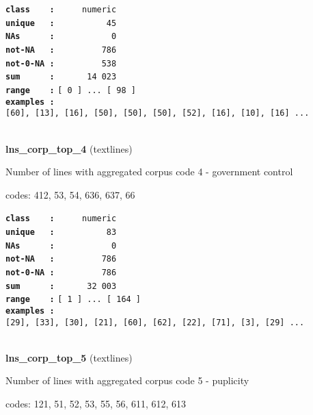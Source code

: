 \documentclass[]{article}
\begin{document}
\textbf{\texttt{class\ \ \ \ :}} \texttt{~~~~~numeric}\\
\textbf{\texttt{unique\ \ \ :}} \texttt{~~~~~~~~~~45}\\
\textbf{\texttt{NAs\ \ \ \ \ \ :}} \texttt{~~~~~~~~~~~0}\\
\textbf{\texttt{not-NA\ \ \ :}} \texttt{~~~~~~~~~786}\\
\textbf{\texttt{not-0-NA\ :}} \texttt{~~~~~~~~~538}\\
\textbf{\texttt{sum\ \ \ \ \ \ :}} \texttt{~~~~~~14~023}\\
\textbf{\texttt{range\ \ \ \ :}}
\texttt{{[}\ 0\ {]}\ ...\ {[}\ 98\ {]}}\\
\textbf{\texttt{examples\ :}}
\texttt{{[}60{]},\ {[}13{]},\ {[}16{]},\ {[}50{]},\ {[}50{]},\ {[}50{]},\ {[}52{]},\ {[}16{]},\ {[}10{]},\ {[}16{]}\ ...}\\

~

\textbf{lns\_corp\_top\_4} (textlines)

Number of lines with aggregated corpus code 4 - government control

codes: 412, 53, 54, 636, 637, 66

\textbf{\texttt{class\ \ \ \ :}} \texttt{~~~~~numeric}\\
\textbf{\texttt{unique\ \ \ :}} \texttt{~~~~~~~~~~83}\\
\textbf{\texttt{NAs\ \ \ \ \ \ :}} \texttt{~~~~~~~~~~~0}\\
\textbf{\texttt{not-NA\ \ \ :}} \texttt{~~~~~~~~~786}\\
\textbf{\texttt{not-0-NA\ :}} \texttt{~~~~~~~~~786}\\
\textbf{\texttt{sum\ \ \ \ \ \ :}} \texttt{~~~~~~32~003}\\
\textbf{\texttt{range\ \ \ \ :}}
\texttt{{[}\ 1\ {]}\ ...\ {[}\ 164\ {]}}\\
\textbf{\texttt{examples\ :}}
\texttt{{[}29{]},\ {[}33{]},\ {[}30{]},\ {[}21{]},\ {[}60{]},\ {[}62{]},\ {[}22{]},\ {[}71{]},\ {[}3{]},\ {[}29{]}\ ...}\\

~

\textbf{lns\_corp\_top\_5} (textlines)

Number of lines with aggregated corpus code 5 - puplicity

codes: 121, 51, 52, 53, 55, 56, 611, 612, 613
\end{document}
